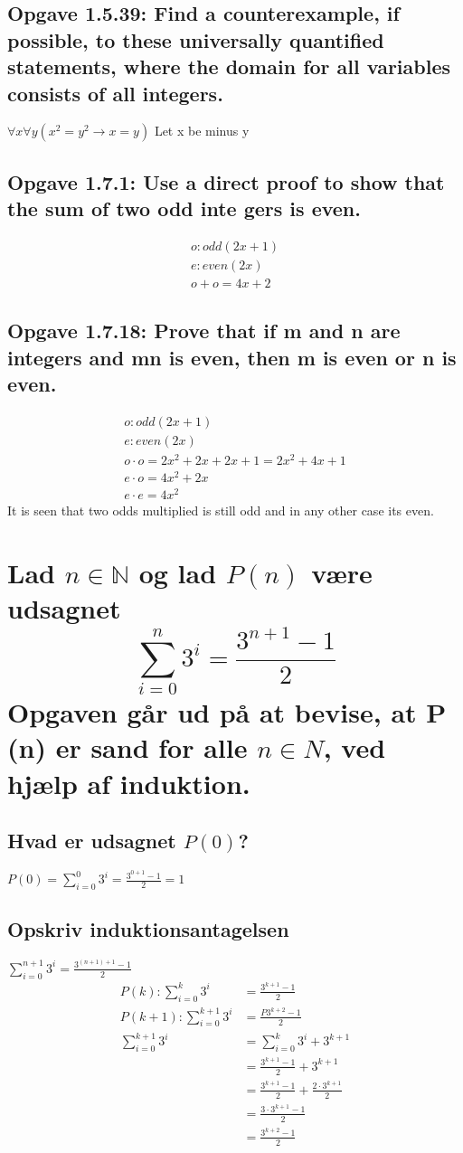 \documentclass[12pt, a4paper]{report}
\begin{document}
			\subsection{Opgave 1.5.39: Find a counterexample, if possible, to these universally quantiﬁed statements, where the domain for all variables consists of all integers.}
				$\forall x \forall y (x^2=y^2\rightarrow x= y)$
				Let x be minus y 
			\setcounter{subsection}{0}
			\subsection{Opgave 1.7.1: Use a direct proof to show that the sum of two odd inte			gers is even.}
				\begin{align*}
					o: odd(2x+1)\\
					e: even(2x)\\
					o+o=4x+2
				\end{align*}
			\setcounter{subsection}{17}
			\subsection{Opgave 1.7.18: Prove that if m and n are integers and mn is even, then m is even or n is even.}
				\begin{align*}
					o: odd(2x+1)\\
					e: even(2x)\\
					o\cdot o =2x^2+2x+2x+1=2x^2+4x+1\\
					e\cdot o = 4x^2+2x\\
					e\cdot e = 4x^2
				\end{align*}
					It is seen that two odds multiplied is still odd and in any other case its even.\\
		\section{Lad $n\in\mathbb{N}$ og lad $P(n)$ være udsagnet $$\sum^n_{i=0}3^i=\frac{3^{n+1}-1}{2}$$Opgaven går ud på at bevise, at P (n) er sand for alle $n \in N$, ved hjælp af induktion.}
			\subsection{Hvad er udsagnet $P(0)$?}
				$P(0)=\sum^0_{i=0}3^i=\frac{3^{0+1}-1}{2}=1$
			\subsection{Opskriv induktionsantagelsen}
				$\sum^{n+1}_{i=0}3^i=\frac{3^{(n+1)+1}-1}{2}$\\
				\begin{align*}
					P(k): \sum_{i=0}^k3^i&=\frac{3^{k+1}-1}{2}\\
					P(k+1): \sum_{i=0}^{k+1}3^i&=\frac{P3^{k+2}-1}{2}\\
				\sum_{i=0}^{k+1}3^i&=\sum_{i=0}^k3^i+3^{k+1}\\
						   &=\frac{3^{k+1}-1}{2}+3^{k+1}\\
						   &=\frac{3^{k+1}-1}{2}+\frac{2\cdot 3^{k+1}}{2}\\
						   &=\frac{3\cdot 3^{k+1}-1}{2}\\
						   &=\frac{3^{k+2}-1}{2}
				\end{align*}
		\setcounter{section}{0}
\end{document}

